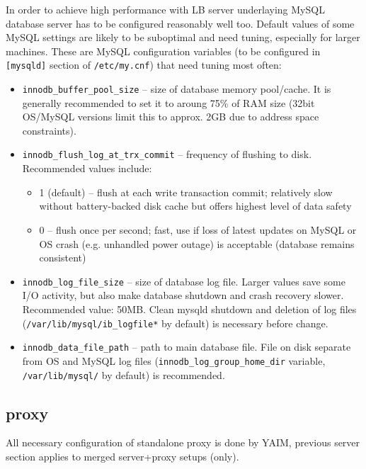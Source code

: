 In order to achieve high performance with LB server underlaying MySQL 
database server has to be configured reasonably well too. 
Default values of some MySQL settings are likely to be suboptimal
and need tuning, especially for larger machines.
These are MySQL configuration variables (to be configured in \texttt{[mysqld]} 
section of \texttt{/etc/my.cnf}) that need tuning most often:
\begin{itemize}
\item \texttt{innodb\_buffer\_pool\_size} -- size of database memory pool/cache. 
It is generally recommended to set it to aroung 75\% of RAM size
(32bit OS/MySQL versions limit this to approx. 2GB due to address space 
constraints).

\item \texttt{innodb\_flush\_log\_at\_trx\_commit} -- frequency of flushing to disk.
Recommended values include:
\begin{itemize}
\item 1 (default) -- flush at each write transaction commit; relatively
slow without battery-backed disk cache but offers highest level of data safety
\item 0 -- flush once per second; fast, use if loss of latest updates on MySQL
or OS crash (e.g. unhandled power outage) is acceptable (database remains consistent)
\end{itemize}

\item \texttt{innodb\_log\_file\_size} -- size of database log file. Larger values
save some I/O activity, but also make database shutdown and crash recovery slower.
Recommended value: 50MB. Clean mysqld shutdown and deletion of log files 
(\texttt{/var/lib/mysql/ib\_logfile*} by default) is necessary before change.

\item \texttt{innodb\_data\_file\_path} -- path to main database file. File on
disk separate from OS and MySQL log files (\texttt{innodb\_log\_group\_home\_dir} variable,
\texttt{/var/lib/mysql/} by default) is recommended.

\end{itemize}

\subsection{\LB proxy}

All necessary configuration of standalone \LB proxy is done by YAIM,
previous \LB server section applies to merged server+proxy setups (\LBnew only).

